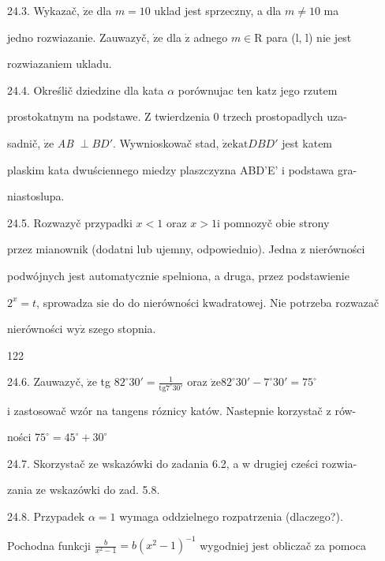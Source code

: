 \documentclass[a4paper,12pt]{article}
\begin{document}
24.3. Wykazač, $\dot{\mathrm{z}}\mathrm{e}$ dla $m=10$ uklad jest sprzeczny, a dla $m\neq 10$ ma

jedno rozwiazanie. Zauwazyč, $\dot{\mathrm{z}}\mathrm{e}$ dla $\dot{\mathrm{z}}$ adnego $m \in \mathrm{R}$ para (l, l) nie jest

rozwiazaniem ukladu.

24.4. Określič dziedzine dla kata $\alpha$ porównujac ten $\mathrm{k}\mathrm{a}\mathrm{t}\mathrm{z}$ jego rzutem

prostokatnym na podstawe. $\mathrm{Z}$ twierdzenia $0$ trzech prostopadlych uza-

sadnič, $\dot{\mathrm{z}}\mathrm{e}$ {\it AB} $\perp BD'$. Wywnioskowač stad, $\dot{\mathrm{z}}\mathrm{e} \mathrm{k}\mathrm{a}\mathrm{t} DBD'$ jest katem

plaskim kata dwuściennego miedzy plaszczyzna ABD'E' $\mathrm{i}$ podstawa gra-

niastoslupa.

24.5. Rozwazyč przypadki $x < 1$ oraz $x > 1 \mathrm{i}$ pomnozyč obie strony

przez mianownik (dodatni lub ujemny, odpowiednio). Jedna $\mathrm{z}$ nierówności

podwójnych jest automatycznie spelniona, a druga, przez podstawienie

$2^{x}=t$, sprowadza $\mathrm{s}\mathrm{i}\mathrm{e}$ do do nierówności kwadratowej. Nie potrzeba rozwazač

nierówności $\mathrm{w}\mathrm{y}\dot{\mathrm{z}}$ szego stopnia.





122

24.6. Zauwazyč, $\dot{\mathrm{z}}\mathrm{e}$ tg $82^{\circ}30' = \displaystyle \frac{1}{\mathrm{t}\mathrm{g}7^{\circ}30'}$ oraz $\dot{\mathrm{z}}\mathrm{e}82^{\circ}30'-7^{\circ}30' = 75^{\circ}$

$\mathrm{i}$ zastosowač wzór na tangens róznicy katów. Nastepnie korzystač $\mathrm{z}$ rów-

ności $75^{\circ}=45^{\circ}+30^{\circ}$

24.7. Skorzystač ze wskazówki do zadania 6.2, a w drugiej cześci rozwia-

zania ze wskazówki do zad. 5.8.

24.8. Przypadek $\alpha=1$ wymaga oddzielnego rozpatrzenia (dlaczego?).

Pochodna funkcji $\displaystyle \frac{b}{x^{2}-1}=b(x^{2}-1)^{-1}$ wygodniej jest obliczač za pomoca
\end{document}
